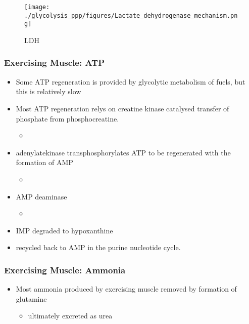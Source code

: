 \documentclass{scrartcl}
\begin{document}
\begin{figure}[htbp]
\centering
\texttt{[image: ./glycolysis\_ppp/figures/Lactate\_dehydrogenase\_mechanism.png]}
\caption{\label{fig:org9e1b259}
LDH}
\end{figure}

\subsubsection{Exercising Muscle: ATP}
\label{sec:orga35d37d}

\begin{itemize}
\item Some ATP regeneration is provided by glycolytic metabolism of fuels,
but this is relatively slow
\item Most ATP regeneration relys on creatine kinase catalysed transfer of
phosphate from phosphocreatine.

\begin{itemize}
\item {}
\end{itemize}

\item adenylatekinase transphosphorylates ATP to be regenerated with the formation
of AMP

\begin{itemize}
\item {}
\end{itemize}

\item AMP deaminase
\begin{itemize}
\item {}
\end{itemize}

\item IMP degraded to hypoxanthine
\item recycled back to AMP in the purine nucleotide cycle.
\end{itemize}

\subsubsection{Exercising Muscle: Ammonia}
\label{sec:org29f7c79}
\begin{itemize}
\item Most ammonia produced by exercising muscle removed by formation of glutamine
\begin{itemize}
\item ultimately excreted as urea
\end{itemize}
\end{itemize}
\end{document}
